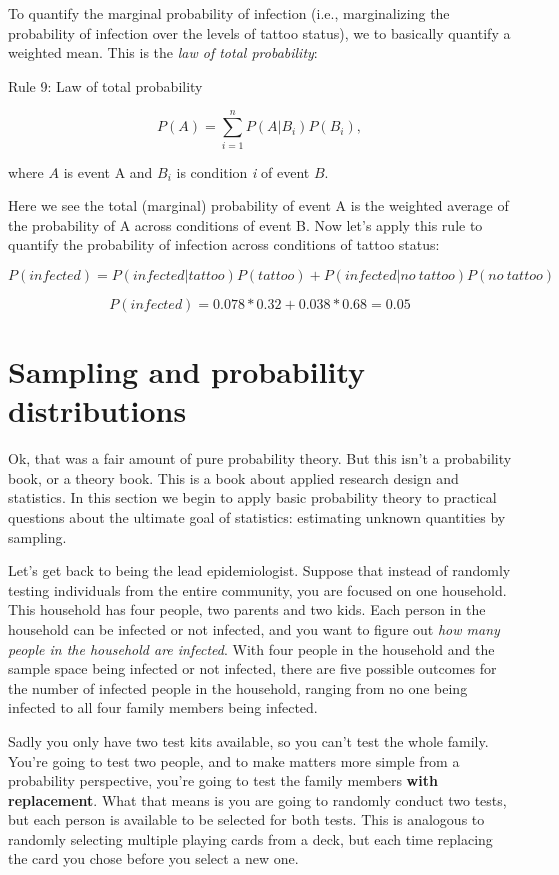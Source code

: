 \documentclass[
]{book}
\begin{document}
To quantify the marginal probability of infection (i.e., marginalizing the probability of infection over the levels of tattoo status), we to basically quantify a weighted mean. This is the \emph{law of total probability}:

Rule 9: Law of total probability

\[
P(A) = \sum_{i=1}^n P(A|B_i)P(B_i),
\]

where \(A\) is event A and \(B_i\) is condition \emph{i} of event \(B\).

Here we see the total (marginal) probability of event A is the weighted average of the probability of A across conditions of event B. Now let's apply this rule to quantify the probability of infection across conditions of tattoo status:

\[
P(infected) = P(infected|tattoo)P(tattoo) + P(infected|no\ tattoo)P(no\ tattoo)
\]

\[
P(infected) =0.078*0.32+0.038*0.68=0.05
\]

\section{Sampling and probability distributions}\label{sampling-and-probability-distributions}

Ok, that was a fair amount of pure probability theory. But this isn't a probability book, or a theory book. This is a book about applied research design and statistics. In this section we begin to apply basic probability theory to practical questions about the ultimate goal of statistics: estimating unknown quantities by sampling.

Let's get back to being the lead epidemiologist. Suppose that instead of randomly testing individuals from the entire community, you are focused on one household. This household has four people, two parents and two kids. Each person in the household can be infected or not infected, and you want to figure out \emph{how many people in the household are infected}. With four people in the household and the sample space being infected or not infected, there are five possible outcomes for the number of infected people in the household, ranging from no one being infected to all four family members being infected.

Sadly you only have two test kits available, so you can't test the whole family. You're going to test two people, and to make matters more simple from a probability perspective, you're going to test the family members \textbf{with replacement}. What that means is you are going to randomly conduct two tests, but each person is available to be selected for both tests. This is analogous to randomly selecting multiple playing cards from a deck, but each time replacing the card you chose before you select a new one.
\end{document}
